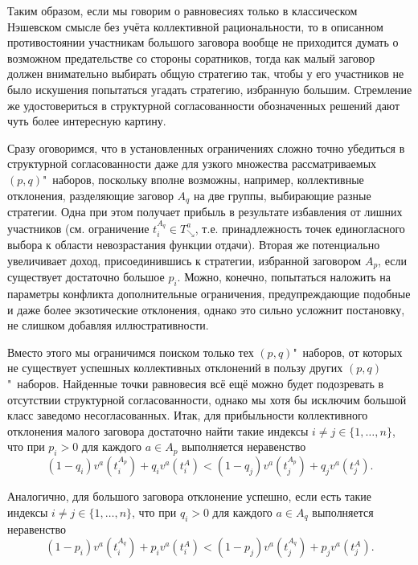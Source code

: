Таким образом, если мы говорим о равновесиях только в классическом Нэшевском смысле без учёта коллективной рациональности, то в описанном противостоянии участникам большого заговора вообще не приходится думать о возможном предательстве со стороны соратников, тогда как малый заговор должен внимательно выбирать общую стратегию так, чтобы у его участников не было искушения попытаться угадать стратегию, избранную большим. Стремление же удостовериться в структурной согласованности обозначенных решений дают чуть более интересную картину.

Сразу оговоримся, что в установленных ограничениях сложно точно убедиться в структурной согласованности даже для узкого множества рассматриваемых $(p, q)$"~наборов, поскольку вполне возможны, например, коллективные отклонения, разделяющие заговор $A_q$ на две группы, выбирающие разные стратегии. Одна при этом получает прибыль в результате избавления от лишних участников (см. ограничение $t_i^{A_q} \in T^a_{\searrow}$, т.е. принадлежность точек единогласного выбора к области невозрастания функции отдачи). Вторая же потенциально увеличивает доход, присоединившись к стратегии, избранной заговором $A_p$, если существует достаточно большое $p_i$. Можно, конечно, попытаться наложить на параметры конфликта дополнительные ограничения, предупреждающие подобные и даже более экзотические отклонения, однако это сильно усложнит постановку, не слишком добавляя иллюстративности.

Вместо этого мы ограничимся поиском только тех $(p, q)$"~наборов, от которых не существует успешных коллективных отклонений в пользу других $(p, q)$"~наборов. Найденные точки равновесия всё ещё можно будет подозревать в отсутствии структурной согласованности, однако мы хотя бы исключим большой класс заведомо несогласованных. Итак, для прибыльности коллективного отклонения малого заговора достаточно найти такие индексы $i \neq j \in \{1, \ldots, n\}$, что при $p_i > 0$ для каждого $a \in A_p$ выполняется неравенство
\begin{equation*}
	(1 - q_i) v^a(t_i^{A_p}) + q_i v^a(t_i^A) < (1 - q_j) v^a(t_j^{A_p}) + q_j v^a(t_j^A).
\end{equation*}

Аналогично, для большого заговора отклонение успешно, если есть такие индексы $i \neq j \in \{1, \ldots, n\}$, что при $q_i > 0$ для каждого $a \in A_q$ выполняется неравенство
\begin{equation*}
	(1 - p_i) v^a(t_i^{A_q}) + p_i v^a(t_i^A) < (1 - p_j) v^a(t_j^{A_q}) + p_j v^a(t_j^A).
\end{equation*}

